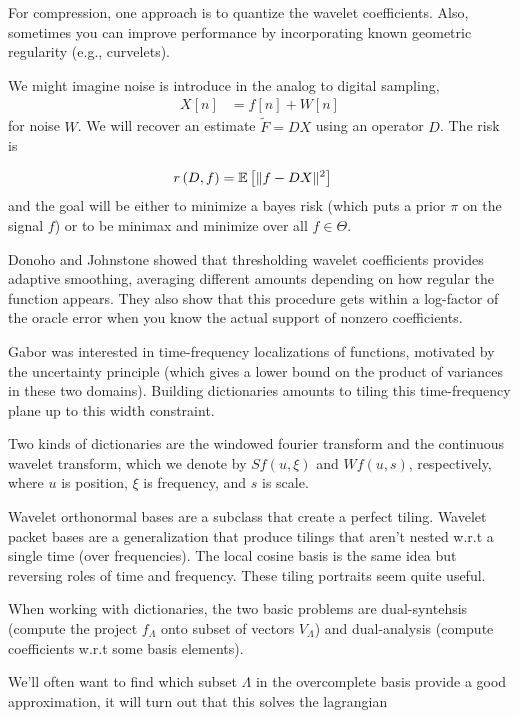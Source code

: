 \documentclass{article}
\begin{document}
For compression, one approach is to quantize the wavelet coefficients. Also,
sometimes you can improve performance by incorporating known geometric
regularity (e.g., curvelets).

We might imagine noise is introduce in the analog to digital sampling,
\begin{align}
X\left[n\right] &= f\left[n\right] + W\left[n\right]
\end{align}
for noise $W$. We will recover an estimate $\tilde{F} = DX$ using an operator
$D$. The risk is

\begin{align}
r\left(D, f\right) &= \mathbb{E}\left[{\|f - DX\|^{2}}\right]
\end{align}
and the goal will be either to minimize a bayes risk (which puts a prior $\pi$
on the signal $f$) or to be minimax and minimize over all $f\in \Theta$.

Donoho and Johnstone showed that thresholding wavelet coefficients provides
adaptive smoothing, averaging different amounts depending on how regular the
function appears. They also show that this procedure gets within a log-factor of
the oracle error when you know the actual support of nonzero coefficients.

Gabor was interested in time-frequency localizations of functions, motivated by
the uncertainty principle (which gives a lower bound on the product of variances
in these two domains). Building dictionaries amounts to tiling this
time-frequency plane up to this width constraint.

Two kinds of dictionaries are the windowed fourier transform and the continuous
wavelet transform, which we denote by $Sf\left(u, \xi\right)$ and $Wf\left(u,
s\right)$, respectively, where $u$ is position, $\xi$ is frequency, and $s$ is
scale.

Wavelet orthonormal bases are a subclass that create a perfect tiling. Wavelet
packet bases are a generalization that produce tilings that aren't nested w.r.t
a single time (over frequencies). The local cosine basis is the same idea but
reversing roles of time and frequency. These tiling portraits seem quite useful.

When working with dictionaries, the two basic problems are dual-syntehsis
(compute the project $f_{\Lambda}$ onto subset of vectors $V_{\Lambda}$) and
dual-analysis (compute coefficients w.r.t some basis elements).

We'll often want to find which subset $\Lambda$ in the overcomplete basis
provide a good approximation, it will turn out that this solves the lagrangian
\end{document}
